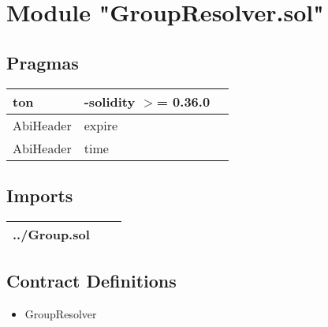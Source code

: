 
\section{Module "GroupResolver.sol"}


\subsection{Pragmas}


\noindent\begin{tabular}{|l|l|p{5cm}|}\hline
ton & -solidity $>$= 0.36.0 &\\\hline
AbiHeader &  expire &\\\hline
AbiHeader &  time &\\\hline
\end{tabular}


\subsection{Imports}


\noindent\begin{tabular}{|l|l|p{5cm}|}\hline
../Group.sol &\\\hline
\end{tabular}


\subsection{Contract Definitions}

\begin{itemize}
\item GroupResolver
\end{itemize}
